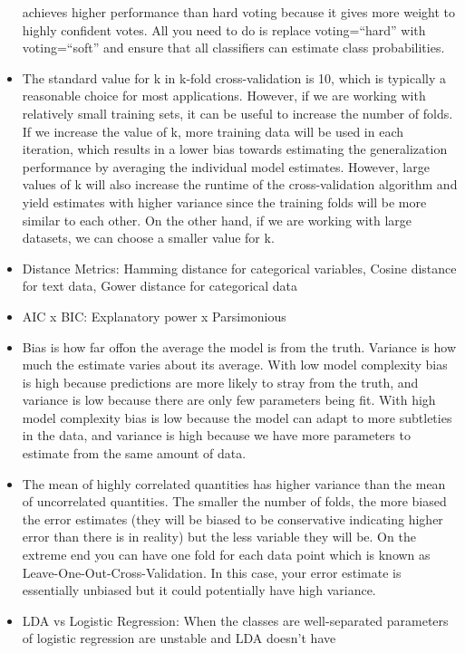 \documentclass[]{book}
\begin{document}
\begin{itemize}
  achieves higher performance than hard voting because it gives more
  weight to highly confident votes. All you need to do is replace
  voting=``hard'' with voting=``soft'' and ensure that all classifiers
  can estimate class probabilities.
\item
  The standard value for k in k-fold cross-validation is 10, which is
  typically a reasonable choice for most applications. However, if we
  are working with relatively small training sets, it can be useful to
  increase the number of folds. If we increase the value of k, more
  training data will be used in each iteration, which results in a lower
  bias towards estimating the generalization performance by averaging
  the individual model estimates. However, large values of k will also
  increase the runtime of the cross-validation algorithm and yield
  estimates with higher variance since the training folds will be more
  similar to each other. On the other hand, if we are working with large
  datasets, we can choose a smaller value for k.
\item
  Distance Metrics: Hamming distance for categorical variables, Cosine
  distance for text data, Gower distance for categorical data
\item
  AIC x BIC: Explanatory power x Parsimonious
\item
  Bias is how far offon the average the model is from the truth.
  Variance is how much the estimate varies about its average. With low
  model complexity bias is high because predictions are more likely to
  stray from the truth, and variance is low because there are only few
  parameters being fit. With high model complexity bias is low because
  the model can adapt to more subtleties in the data, and variance is
  high because we have more parameters to estimate from the same amount
  of data.
\item
  The mean of highly correlated quantities has higher variance than the
  mean of uncorrelated quantities. The smaller the number of folds, the
  more biased the error estimates (they will be biased to be
  conservative indicating higher error than there is in reality) but the
  less variable they will be. On the extreme end you can have one fold
  for each data point which is known as Leave-One-Out-Cross-Validation.
  In this case, your error estimate is essentially unbiased but it could
  potentially have high variance.
\item
  LDA vs Logistic Regression: When the classes are well-separated
  parameters of logistic regression are unstable and LDA doesn't have

\end{itemize}
\end{document}
